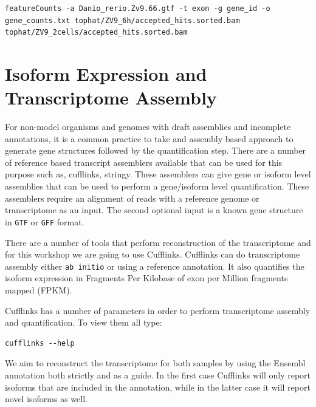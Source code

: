 \begin{steps}
\begin{lstlisting}[style=command_syntax]
featureCounts -a Danio_rerio.Zv9.66.gtf -t exon -g gene_id -o gene_counts.txt tophat/ZV9_6h/accepted_hits.sorted.bam tophat/ZV9_2cells/accepted_hits.sorted.bam
\end{lstlisting}
\end{steps}


\newpage
\section{Isoform Expression and Transcriptome Assembly}

\begin{information}
For non-model organisms and genomes with draft assemblies and incomplete annotations, it is a common practice to take and assembly based approach to generate gene structures followed by the quantification step. There are a number of reference based transcript assemblers available that can be used for this purpose such as, cufflinks, stringy. These assemblers can give gene or isoform level assemblies that can be used to perform a gene/isoform level quantification. These assemblers require an alignment of reads with a reference genome or transcriptome as an input. The second optional input is a known gene structure in \texttt{GTF} or \texttt{GFF} format. 
\end{information}

There are a number of tools that perform reconstruction of the transcriptome
and for this workshop we are going to use Cufflinks. Cufflinks can do
transcriptome assembly either \texttt{ab initio} or using a reference annotation. It
also quantifies the isoform expression in Fragments
Per Kilobase of exon per Million fragments mapped (FPKM).

\begin{steps}
Cufflinks has a number of parameters in order to perform transcriptome
assembly and quantification. To view them all type:

\begin{lstlisting}
cufflinks --help
\end{lstlisting}
\end{steps}

We aim to reconstruct the transcriptome for both samples by using the Ensembl
annotation both strictly and as a guide. In the first case Cufflinks will only
report isoforms that are included in the annotation, while in the latter case
it will report novel isoforms as well.

